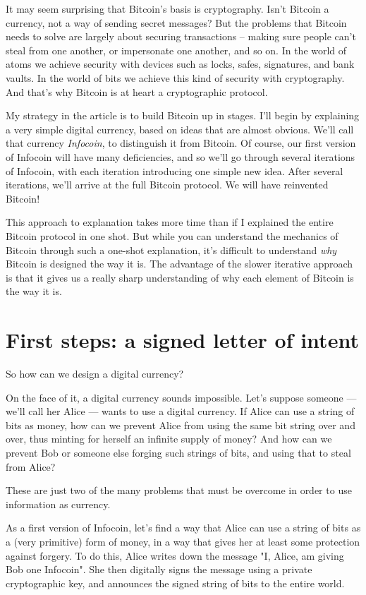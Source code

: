 \documentclass[12pt]{book}
\newcounter{problem}[chapter]
\begin{document}
%
%
It may seem surprising that Bitcoin's basis is cryptography.  Isn't
Bitcoin a currency, not a way of sending secret messages?  But the
problems that Bitcoin needs to solve are largely about securing
transactions -- making sure people can't steal from one another, or
impersonate one another, and so on.  In the world of atoms we achieve
security with devices such as locks, safes, signatures, and bank
vaults.  In the world of bits we achieve this kind of security with
cryptography.  And that's why Bitcoin is at heart a cryptographic
protocol.

My strategy in the article is to build Bitcoin up in stages.  I'll
begin by explaining a very simple digital currency, based on ideas
that are almost obvious.  We'll call that currency \emph{Infocoin}, to
distinguish it from Bitcoin.  Of course, our first version of Infocoin
will have many deficiencies, and so we'll go through several
iterations of Infocoin, with each iteration introducing one simple new
idea. After several iterations, we'll arrive at the full Bitcoin
protocol.  We will have reinvented Bitcoin!

This approach to explanation takes more time than if I explained the
entire Bitcoin protocol in one shot.  But while you can understand the
mechanics of Bitcoin through such a one-shot explanation, it's
difficult to understand \emph{why} Bitcoin is designed the way it is.
The advantage of the slower iterative approach is that it gives us a
really sharp understanding of why each element of Bitcoin is the way
it is.

\section{First steps: a signed letter of intent}

So how can we design a digital currency?  

On the face of it, a digital currency sounds impossible.  Let's
suppose someone --- we'll call her Alice --- wants to use a digital
currency.  If Alice can use a string of bits as money, how can we
prevent Alice from using the same bit string over and over, thus
minting for herself an infinite supply of money?  And how can we
prevent Bob or someone else forging such strings of bits, and using
that to steal from Alice?

These are just two of the many problems that must be overcome in order
to use information as currency.

As a first version of Infocoin, let's find a way that Alice can use a
string of bits as a (very primitive) form of money, in a way that
gives her at least some protection against forgery.  To do this, Alice
writes down the message "I, Alice, am giving Bob one Infocoin".  She
then digitally signs the message using a private cryptographic key,
and announces the signed string of bits to the entire world.
\end{document}
